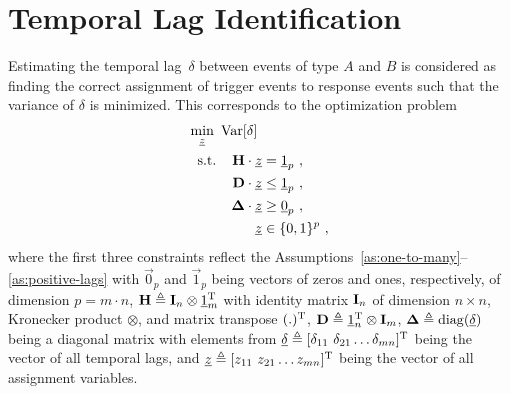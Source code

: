 \documentclass[journal, 10pt]{IEEEtran}
\begin{document}
\section{Temporal Lag Identification}
\label{sec:lp}
%
Estimating the temporal lag~$\delta$ between events of type $A$ and $B$ is considered as finding the correct assignment of trigger events to response events such that the variance of $\delta$ is minimized. This corresponds to the optimization problem
%
\begin{align}
	\label{eq:optimization-problem}
	\min_{\vz} \ \Var[\delta] \ & \\
	\text{s.t.} \hspace{4mm} \H \cdot \vz &= \vec 1_p~,\\
		 \D \cdot \vz &\le \vec 1_p~, \\
	 \mat \Delta \cdot \vz &\ge \vec 0_p~, \\
		\vz &\in \{0,1\}^p~,
\end{align}
%
where the first three constraints reflect the Assumptions~\ref{as:one-to-many}--\ref{as:positive-lags} with $\vec 0_p$ and $\vec 1_p$ being vectors of zeros and ones, respectively, of dimension $p=m\cdot n$, 
${{\mathbf{H}}} \triangleq {\ensuremath{{\mathbf{I}}}}_n \otimes {\underline{1}}_m^\mathrm{T}$ with identity matrix ${{\mathbf{I}}}_n$ of dimension $n\times n$, Kronecker product $\otimes$, and matrix transpose $(.)^\mathrm{T}$, 
${{\mathbf{D}}} \triangleq {\underline{1}}_n^\mathrm{T} \otimes {\ensuremath{{\mathbf{I}}}}_m$, 
${{\mathbf{\Delta}}} \triangleq \operatorname{diag}({\underline{\delta}})$ being a diagonal matrix with elements from  
${\underline{\delta}} \triangleq [\delta_{11}\ \delta_{21} \ldots \delta_{mn}]^\mathrm{T}$ being the vector of all temporal lags, and
${\underline{z}} \triangleq [z_{11}\ z_{21} \ldots z_{mn}]^\mathrm{T}$ being the vector of all assignment variables.%
\end{document}
